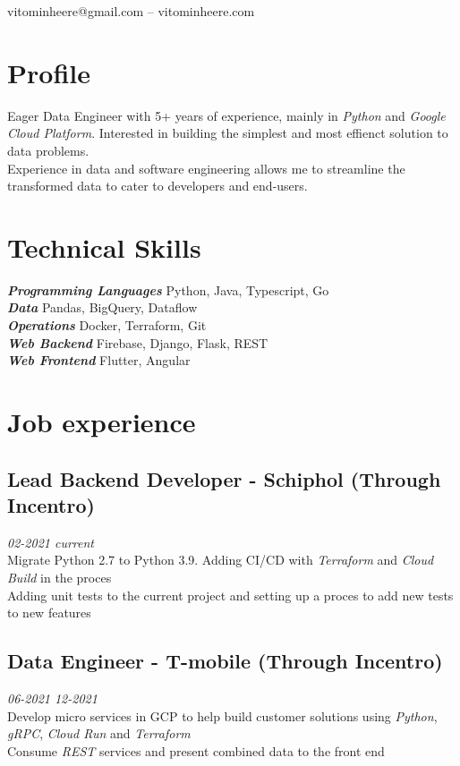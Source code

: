 \documentclass{article}
\makeatletter
\renewcommand{\maketitle}{
\begin{center}
	{\huge\bfseries
	\theauthor}

\vspace*{1cm}
vitominheere@gmail.com -- vitominheere.com

\end{center}
}
\makeatother
\begin{document}
\author{Vito Minheere}


\maketitle

\section{\sc Profile}
Eager Data Engineer with 5+ years of experience, mainly in \emph{Python} and \emph{Google Cloud Platform}. Interested in building the simplest and most effienct solution to data problems. \\
Experience in data and software engineering allows me to streamline the transformed data to cater to developers and end-users.

\section{\sc Technical Skills}
{\sl \textbf{Programming Languages}} Python, Java, Typescript, Go \\
{\sl \textbf{Data }} Pandas, BigQuery, Dataflow \\
{\sl \textbf{Operations }} Docker, Terraform, Git \\
{\sl \textbf{Web Backend }} Firebase, Django, Flask, REST \\
{\sl \textbf{Web Frontend }} Flutter, Angular \\

\section{\sc Job experience}
\subsection{Lead Backend Developer - Schiphol (Through Incentro)} \hfill {\em 02-2021 current} \\
Migrate Python 2.7 to Python 3.9. Adding CI/CD with \emph{Terraform} and \emph{Cloud Build} in the proces \\
Adding unit tests to the current project and setting up a proces to add new tests to new features \\


\subsection{Data Engineer - T-mobile (Through Incentro)} \hfill {\em 06-2021 12-2021} \\
Develop micro services in GCP to help build customer solutions using \emph{Python}, \emph{gRPC}, \emph{Cloud Run} and \emph{Terraform}  \\
Consume \emph{REST} services and present combined data to the front end \\
\end{document}
